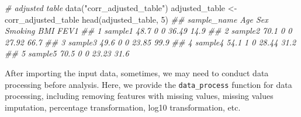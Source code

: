 \documentclass[]{article}
\newcommand{\hlnum}[1]{\textcolor[rgb]{0.816,0.125,0.439}{#1}}%
\newcommand{\hlstr}[1]{\textcolor[rgb]{0.251,0.627,0.251}{#1}}%
\newcommand{\hlcom}[1]{\textcolor[rgb]{0.502,0.502,0.502}{\textit{#1}}}%
\newcommand{\hlstd}[1]{\textcolor[rgb]{0.251,0.251,0.251}{#1}}%
\newcommand{\hlkwd}[1]{\textcolor[rgb]{0.878,0.439,0.125}{#1}}%
\newenvironment{Shaded}{\begin{myshaded}}{\end{myshaded}}
\newcommand{\KeywordTok}[1]{\hlkwd{#1}}
\newcommand{\DecValTok}[1]{\hlnum{#1}}
\newcommand{\StringTok}[1]{\hlstr{#1}}
\newcommand{\CommentTok}[1]{\hlcom{#1}}
\newcommand{\NormalTok}[1]{\hlstd{#1}}
\begin{document}
\begin{Shaded}
\begin{Highlighting}[]
\CommentTok{# adjusted table}
\KeywordTok{data}\NormalTok{(}\StringTok{"corr_adjusted_table"}\NormalTok{)}
\NormalTok{adjusted_table <-}\StringTok{ }\NormalTok{corr_adjusted_table}
\KeywordTok{head}\NormalTok{(adjusted_table, }\DecValTok{5}\NormalTok{)}
\CommentTok{##   sample_name  Age Sex Smoking   BMI FEV1}
\CommentTok{## 1     sample1 48.7   0       0 36.49 14.9}
\CommentTok{## 2     sample2 70.1   0       0 27.92 66.7}
\CommentTok{## 3     sample3 49.6   0       0 23.85 99.9}
\CommentTok{## 4     sample4 54.1   1       0 28.44 31.2}
\CommentTok{## 5     sample5 70.5   0       0 23.23 31.6}
\end{Highlighting}
\end{Shaded}

After importing the input data, sometimes, we may need to conduct data processing before analysis. Here, we provide the \texttt{data\_process} function for data processing, including removing features with missing values, missing values imputation, percentage transformation, log10 transformation, etc.
\end{document}
